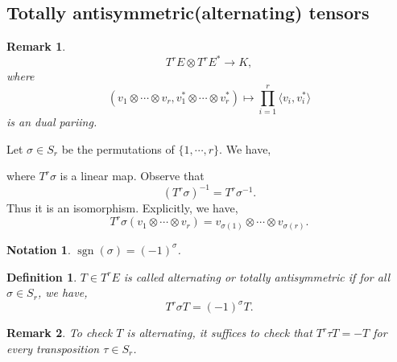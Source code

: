 \documentclass[10pt]{article}
\newtheorem{definition}{Definition}[section]
\newtheorem{notation}{Notation}[section]
\newtheorem{remark}{Remark}[section]
\DeclareMathOperator{\sgn}{sgn}
\begin{document}
\subsection{Totally antisymmetric(alternating) tensors}
\begin{remark}
  \begin{equation*}
    T^rE\otimes T^rE^*\to K,
  \end{equation*}
  where 
  \begin{equation*}
    (v_1\otimes\cdots\otimes v_r,v_1^*\otimes\cdots\otimes v_r^*)\mapsto \prod_{i=1}^r\langle v_i,v_i^*\rangle
  \end{equation*}
  is an dual pariing. 
\end{remark}
Let $\sigma\in S_r$ be the permutations of $\{1,\cdots,r\}$. We have,
\begin{center}
\end{center}
where $T^r\sigma$ is a linear map. Observe that
\begin{equation*}
  (T^r\sigma)^{-1}= T^r{\sigma}^{-1}.
\end{equation*}
Thus it is an isomorphism. Explicitly, we have,
\begin{equation*}
  T^r\sigma(v_1\otimes \cdots\otimes v_r) = v_{\sigma(1)}\otimes\cdots\otimes v_{\sigma(r)}.
\end{equation*}
\begin{notation}
  $\sgn(\sigma) = (-1)^\sigma$.
\end{notation}

\begin{definition}
  $T\in T^rE$ is called alternating or totally antisymmetric if for all $\sigma\in S_r$, we have,
  \begin{equation*}
    T^r\sigma T = (-1)^{\sigma}T.
  \end{equation*}
\end{definition}

\begin{remark}
  To check $T$ is alternating, it suffices to check that $T^r\tau T = -T$ for every transposition $\tau\in S_r$.
\end{remark}
\end{document}
